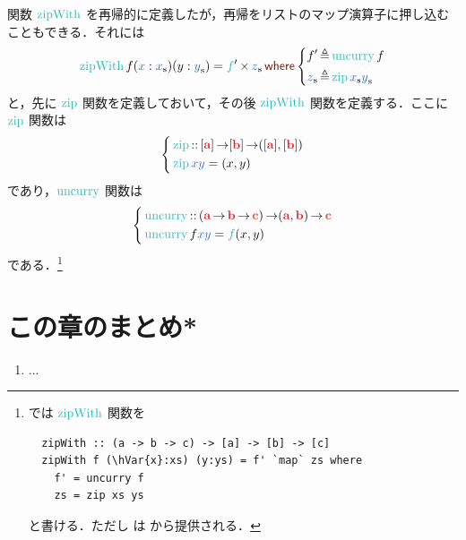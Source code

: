 \documentclass[a5paper,twoside,fleqn,draft]{jsbook}
\begin{document}
関数 $\mZipWith$ を再帰的に定義したが，再帰をリストのマップ演算子に押し込むこともできる．それには
\begin{equation}
  \mZipWith f(\hVar{x}:\hListVar{x})(y:\hListVar{y})
  =\hFunc{f}'\hMap\hListVar{z}
  \mWhere
  \left\{
  \begin{aligned}
    f'
    &\mLetEq\hUncurry f\\
    \hListVar{z}
    &\mLetEq\mZipFunc\hListVar{x}\hListVar{y}
  \end{aligned}
  \right.
\end{equation}
と，先に $\mZipFunc$ 関数を定義しておいて，その後 $\mZipWith$ 関数を定義する．ここに $\mZipFunc$ 関数は
\begin{equation}
  \left\{
  \begin{aligned}
    {}&\mZipFunc\hIsTypeOf{}\mProjEXP{\hListConstruct{\hTypeName{a}}}
    {\mProjEXP{[\hTypeName{b}]}
      {(\hListConstruct{\hTypeName{a}},[\hTypeName{b}])}}\\
    {}&\mZipFunc \hVar{x}\hVar{y}=(x,y)
  \end{aligned}
  \right.
\end{equation}
であり，$\hUncurry$ 関数は
\begin{equation}
  \left\{
  \begin{aligned}
    {}&\hUncurry\hIsTypeOf{}
    \mProjEXP{(\mProjEXP{\hTypeName{a} }{\mProjEXP{\hTypeName{b} }{\mC }})}
          {\mProjEXP{(\hTypeName{a} ,\hTypeName{b} )}{\mC }}\\
          {}&\hUncurry f\hVar{x}\hVar{y}=\hFunc{f}(x,y)
  \end{aligned}
  \right.
\end{equation}
である．\footnote{\haskell では $\mZipWith$ 関数を
\begin{verbatim}
  zipWith :: (a -> b -> c) -> [a] -> [b] -> [c]
  zipWith f (\hVar{x}:xs) (y:ys) = f' `map` zs where
    f' = uncurry f
    zs = zip xs ys
\end{verbatim}
と書ける．ただし  は  から提供される．}


\section{この章のまとめ*}

\begin{enumerate}
\item ...
\end{enumerate}
\end{document}
